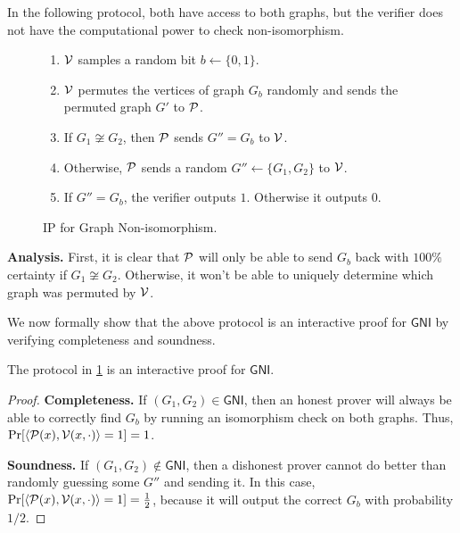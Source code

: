 In the following protocol, both have access to both graphs, but the verifier does not have the computational power to check non-isomorphism.

\begin{figure}[h]
	\begin{mdframed}[
		linecolor=black,
		linewidth=1pt,
		roundcorner=5pt,
		backgroundcolor=white,
		userdefinedwidth=\textwidth,
		]
		\vspace{2mm}
		\begin{enumerate}
			\item $\mathcal{V}$ samples a random bit $b\leftarrow\{0,1\}$.
			\item $\mathcal{V}$ permutes the vertices of graph $G_b$ randomly and sends the permuted graph $G'$ to $\mathcal{P}$.
			\item If $G_1\not\cong G_2$, then $\mathcal{P}$ sends $G''=G_b$ to $\mathcal{V}$.
			\item Otherwise, $\mathcal{P}$ sends a random $G''\leftarrow\{G_1, G_2\}$ to $\mathcal{V}$.
			\item If $G''=G_b$, the verifier outputs $1$. Otherwise it outputs $0$.
		\end{enumerate}
		\vspace{2mm}
	\end{mdframed}
	\caption{IP for Graph Non-isomorphism.}
	\label{fig:2}
\end{figure}

\textbf{Analysis.} First, it is clear that $\mathcal{P}$ will only be able to send $G_b$ back with $100\%$ certainty if $G_1\not\cong G_2$. Otherwise, it won't be able to uniquely determine which graph was permuted by $\mathcal{V}$.

We now formally show that the above protocol is an interactive proof for $\mathsf{GNI}$ by verifying completeness and soundness.

\vspace{3mm}

\begin{theorem}
	The protocol in \ref{fig:2} is an interactive proof for $\mathsf{GNI}$.
\end{theorem}

\begin{proof}
	\textbf{Completeness.} If $(G_1, G_2)\in\mathsf{GNI}$, then an honest prover will always be able to correctly find $G_b$ by running an isomorphism check on both graphs. Thus, $\Pr[\langle\mathcal{P}(x), \mathcal{V}(x, \cdot)\rangle=1]=1$.
	
	\textbf{Soundness.} If $(G_1, G_2)\notin\mathsf{GNI}$, then a dishonest prover cannot do better than randomly guessing some $G''$ and sending it. In this case, $\Pr[\langle\mathcal{P}(x), \mathcal{V}(x, \cdot)\rangle=1]=\frac{1}{2}$, because it will output the correct $G_b$ with probability $1/2$.
\end{proof}

